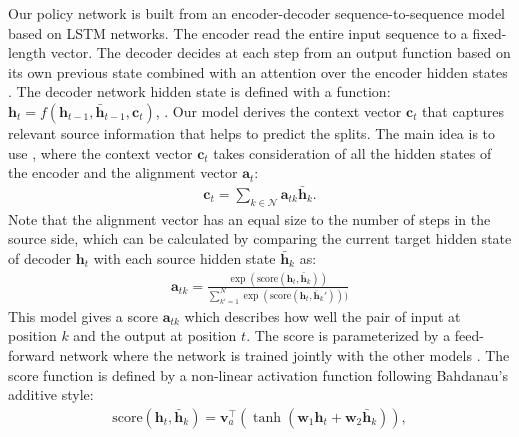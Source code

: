  Our policy network is built from an encoder-decoder sequence-to-sequence model based on LSTM networks.  The encoder read the entire input sequence to a fixed-length vector. The decoder decides  at each step from an output function based on its own previous state combined with an attention over the encoder hidden states \cite{attention_bahdanau}. The decoder network hidden state is defined with a function: $\bm{h}_t = f(\bm{h}_{t-1}, \bm{\bar{h}}_{t-1}, \bm{c}_t)$, . 
Our model derives the context vector $\bm{c}_t$ that captures relevant source information that helps to predict the splits. The main idea is to use , where the context vector $\bm{c}_t$ takes consideration of all the hidden states of the encoder and the alignment vector $\bm{a}_{t}$: 
\begin{align}
	\bm{c}_t = \sum_{k \in \mathcal{N}} \bm{a}_{tk} \bm{\bar{h}}_k.
\end{align}
%
% 
Note that the alignment vector has an equal size to the number of steps in the source side, which can be calculated by comparing the current target hidden state of decoder $\bm{h}_t$ with each source hidden state $\bm{\bar{h}}_k$ as:
\begin{align} \label{eq:softmax}
	 \bm{a}_{tk} = \frac{\exp(\text{score}(\bm{h}_t,\bm{\bar{h}}_k))}{\sum_{k'=1}^{N} \exp(\text{score}(\bm{h}_t,\bm{\bar{h}}_k')))}
\end{align}
This  model gives a score $\bm{a}_{tk}$ which describes how well the pair of input at position $k$ and the output at position $t$. The  score is parameterized by a feed-forward network where the network is trained jointly with the other models \cite{attention_bahdanau}. The score function is defined by a non-linear activation function following Bahdanau's additive style:
\begin{align}\label{eq:score}
	\text{score}(\bm{h}_t,\bm{\bar{h}}_k) = \bm{v}_a^{\top} (\tanh(\bm{w}_1 \bm{h}_t +  \bm{w}_2 \bm{\bar{h}}_k )),
\end{align}
%
%
